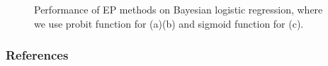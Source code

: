 \documentclass{article} %
\begin{document}
\begin{figure}
\centering
%
\def\svgwidth{0.3\linewidth}
\subfigure[\label{fig:sep_logit}]{
}
%
\caption{Performance of EP methods on Bayesian logistic regression, where we use probit function for (a)(b) and sigmoid function for (c).}
\end{figure}

\subsubsection*{References}
\renewcommand{\section}[2]{}


\end{document}
